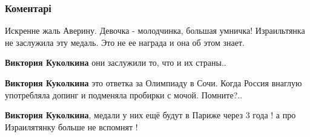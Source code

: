  
 
 
 
 
\subsubsection{Коментарі}
\label{sec:08_08_2021.fb.zaharova_maria.mid_rf.1.koncert_olimpijcy.cmt}

\begin{itemize}


Искренне жаль Аверину. Девочка - молодчинка, большая умничка! Израильтянка не
заслужила эту медаль. Это не ее награда и она об этом знает.

\begin{itemize}
 
\textbf{Виктория Куколкина} они заслужили то, что и их страны..

 
\textbf{Виктория Куколкина} это ответка за Олимпиаду в Сочи. Когда Россия внаглую употребляла допинг и подменяла пробирки с мочой. Помните?..

 
\textbf{Виктория Куколкина}, медали у них ещё будут в Париже через 3 года ! а про Израилятянку больше не вспомнят !


\end{itemize}
\end{itemize}
